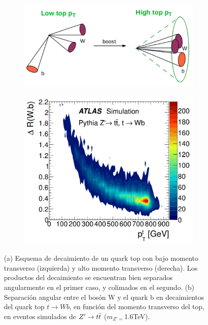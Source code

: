 \begin{figure}
    \centering
    \begin{subfigure}[b]{0.53\textwidth}
        \centering
        \includegraphics[width=\textwidth]{images/boost}
        \caption{}
        \label{fig:Boost}
    \end{subfigure}
    \hfill
    \begin{subfigure}[b]{0.42\textwidth}
        \centering
        \includegraphics[width=\textwidth]{images/fatjet}
        \caption{}
        \label{fig:fatjets}
    \end{subfigure}
    \caption{(a) Esquema de decaimiento de un quark top con bajo momento transverso (izquierda) y alto momento transverso (derecha). Los productos del decaimiento se encuentran bien separados angularmente en el primer caso, y colimados en el segundo. (b) Separación angular entre el bosón W y el quark b en decaimientos del quark top $t\rightarrow Wb$, en función del momento transverso del top, en eventos simulados de $Z'\rightarrow t\Bar{t}$ ($m_{Z'=}$1.6TeV)\cite{fatjets}.}
    \label{fig:TopTecni}
\end{figure}

